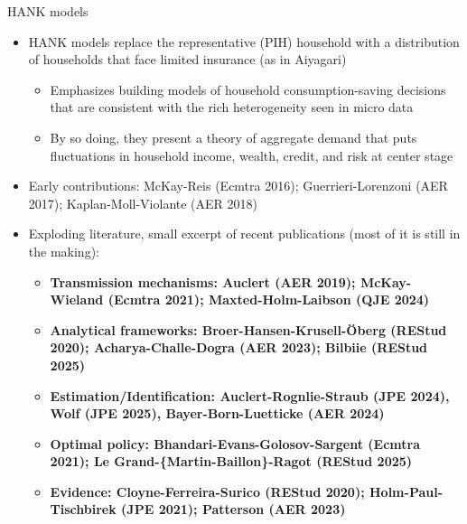 \documentclass[9pt]{beamer}
\newcommand{\bit}{\begin{itemize}}
\newcommand{\eit}{\end{itemize}}
\begin{document}
\begin{frame}{HANK models}

\begin{itemize}
	\setlength\itemsep{1.2em}
	\item HANK models replace the representative (PIH) household with a distribution of households that face limited insurance (as in Aiyagari) 
	\bit
		\setlength\itemsep{0.5em}
	
	
	\item Emphasizes building models of household consumption-saving decisions that are consistent with the rich heterogeneity seen in micro data
	
	\item By so doing, they present a theory of aggregate demand that puts fluctuations in household income, wealth, credit, and risk at center stage
	
	\eit
	
	\item Early contributions: McKay-Reis (Ecmtra 2016); Guerrieri-Lorenzoni (AER 2017); Kaplan-Moll-Violante (AER 2018)
	
	\item Exploding literature, small excerpt of recent publications (most of it is still in the making):
	
	\bit
		\setlength\itemsep{0.5em}
			
		\item \bf Transmission mechanisms: \normalfont Auclert (AER 2019); McKay-Wieland (Ecmtra 2021); Maxted-Holm-Laibson (QJE 2024)
		
		\item \bf Analytical frameworks: \normalfont Broer-Hansen-Krusell-{\"O}berg (REStud 2020); Acharya-Challe-Dogra (AER 2023); Bilbiie (REStud 2025)
		
		\item \bf Estimation/Identification: \normalfont Auclert-Rognlie-Straub (JPE 2024), Wolf (JPE 2025), Bayer-Born-Luetticke (AER 2024)
	
		\item \bf Optimal policy: \normalfont Bhandari-Evans-Golosov-Sargent (Ecmtra 2021); Le Grand-\{Martin-Baillon\}-Ragot (REStud 2025) 
		
		\item \bf Evidence: \normalfont Cloyne-Ferreira-Surico (REStud 2020); Holm-Paul-Tischbirek (JPE 2021); Patterson (AER 2023) 
	\eit
	
	
	 
\end{itemize}


\end{frame}
\end{document}
